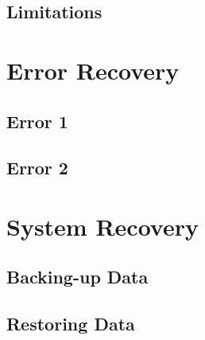 \subsection{Limitations}

\section{Error Recovery}

\subsection{Error 1}

\subsection{Error 2}

\section{System Recovery}

\subsection{Backing-up Data}

\subsection{Restoring Data}
